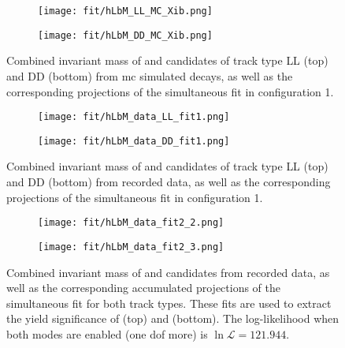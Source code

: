 \begin{figure}[htbp]
    \centering
    \begin{subfigure}[b]{\textwidth}
        \centering
        \texttt{[image: fit/hLbM\_LL\_MC\_Xib.png]}
    \end{subfigure}
    \par\bigskip 
    \begin{subfigure}[b]{\textwidth}
        \centering
        \texttt{[image: fit/hLbM\_DD\_MC\_Xib.png]}
    \end{subfigure}
    \caption{Combined invariant mass of \Dz and \Lz candidates of track type \gls{LL} (top) and \gls{DD} (bottom) from \gls{mc} simulated \decay{\Xibz}{\Dz\Lz} decays, as well as the corresponding projections of the simultaneous fit in configuration 1.}
    \label{fig:fit_hLbM_MC_Xib}
\end{figure}

\begin{figure}[htbp]
    \centering
    \begin{subfigure}[b]{\textwidth}
        \centering
        \texttt{[image: fit/hLbM\_data\_LL\_fit1.png]}
    \end{subfigure}
    \par\bigskip 
    \begin{subfigure}[b]{\textwidth}
        \centering
        \texttt{[image: fit/hLbM\_data\_DD\_fit1.png]}
    \end{subfigure}
    \caption{Combined invariant mass of \Dz and \Lz candidates of track type \gls{LL} (top) and \gls{DD} (bottom) from recorded data, as well as the corresponding projections of the simultaneous fit in configuration 1.}
    \label{fig:fit_hLbM_data_fit1_LLDD}
\end{figure}

\begin{figure}[htbp]
    \centering
    \begin{subfigure}[b]{\textwidth}
        \centering
        \texttt{[image: fit/hLbM\_data\_fit2\_2.png]}
    \end{subfigure}
    \par\bigskip 
    \begin{subfigure}[b]{\textwidth}
        \centering
        \texttt{[image: fit/hLbM\_data\_fit2\_3.png]}
    \end{subfigure}
    \caption{Combined invariant mass of \Dz and \Lz candidates from recorded data, as well as the corresponding accumulated projections of the simultaneous fit for both track types. These fits are used to extract the yield significance of \decay{\Lb}{\Dz\Lz} (top) and \decay{\Xibz}{\Dz\Lz} (bottom). The log-likelihood when both modes are enabled (one \gls{dof} more) is $\ln \mathcal{L} = 121.944$.}
    \label{fig:fit_hLbM_data_fit23}
\end{figure}


